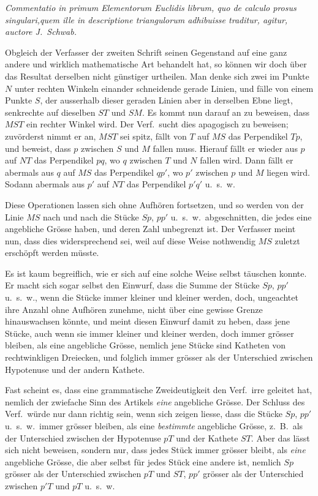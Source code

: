 \documentclass[fontsize=10pt,paper=a5,pagesize,headings=small,headinclude=true,footinclude=true]{scrbook}
\begin{document}
\textit{Commentatio in primum Elementorum Euclidis librum, quo de calculo prosus singulari,\linebreak quem ille in descriptione triangulorum adhibuisse traditur, agitur, auctore J.~Schwab.}

Obgleich der Verfasser der zweiten Schrift seinen Gegenstand auf eine ganz andere und wirklich mathematische Art behandelt hat, so können wir doch über das Resultat derselben nicht günstiger urtheilen. Man denke sich zwei im Punkte $N$ unter rechten Winkeln einander schneidende gerade Linien, und fälle von einem Punkte $S$, der ausserhalb dieser geraden Linien aber in derselben Ebne liegt, senkrechte auf dieselben $ST$ und $SM$. Es kommt nun darauf an zu beweisen, dass $MS T$ ein rechter Winkel wird. Der Verf.~sucht dies apagogisch zu beweisen; zuvörderst nimmt er an, $MST$ sei spitz, fällt von $T$ auf $MS$ das Perpendikel $Tp$, und beweist, dass $p$ zwischen $S$ und $M$ fallen muss. Hierauf fällt er wieder aus $p$ auf $NT$ das Perpendikel $pq$, wo $q$ zwischen $T$ und $N$ fallen wird. Dann fällt er abermals aus $q$ auf $MS$ das Perpendikel $qp'$, wo $p'$ zwischen $p$ und $M$ liegen wird. Sodann abermals aus $p'$ auf $NT$ das Perpendikel $p'q'$ u.~s.~w.

Diese Operationen lassen sich ohne Aufhören fortsetzen, und so werden von der Linie $MS$ nach und nach die Stücke $Sp$, $pp'$ u.~s.~w.~abgeschnitten, die jedes eine angebliche Grösse haben, und deren Zahl unbegrenzt ist. Der Verfasser meint nun, dass dies widersprechend sei, weil auf diese Weise nothwendig $MS$ zuletzt erschöpft werden müsste.

Es ist kaum begreiflich, wie er sich auf eine solche Weise selbst täuschen konnte. Er macht sich sogar selbst den Einwurf, dass die Summe der Stücke $Sp$, $pp'$ u.~s.~w., wenn die Stücke immer kleiner und kleiner werden, doch, ungeachtet ihre Anzahl ohne Aufhören zunehme, nicht über eine gewisse Grenze hinauswachsen könnte, und meint diesen Einwurf damit zu heben, dass jene Stücke, auch wenn sie immer kleiner und kleiner werden, doch immer grösser bleiben, als eine angebliche Grösse, nemlich jene Stücke sind Katheten von rechtwinkligen Dreiecken, und folglich immer grösser als der Unterschied zwischen Hypotenuse und der andern Kathete.

Fast scheint es, dass eine grammatische Zweideutigkeit den Verf.~irre geleitet hat, nemlich der zwiefache Sinn des Artikels \textit{eine} angebliche Grösse. Der Schluss des Verf.~würde nur dann richtig sein, wenn sich zeigen liesse, dass die Stücke $Sp$, $pp'$ u.~s.~w.~immer grösser bleiben, als eine \textit{bestimmte} angebliche Grösse, z.~B.~als der Unterschied zwischen der Hypotenuse $pT$ und der Kathete $ST$. Aber das lässt sich nicht beweisen, sondern nur, dass jedes Stück immer grösser bleibt, als \textit{eine} angebliche Grösse, die aber selbst für jedes Stück eine andere ist, nemlich $Sp$ grösser als der Unterschied zwischen $pT$ und $ST$, $pp'$ grösser als der Unterschied zwischen $p'T$ und $pT$ u.~s.~w.
\end{document}
